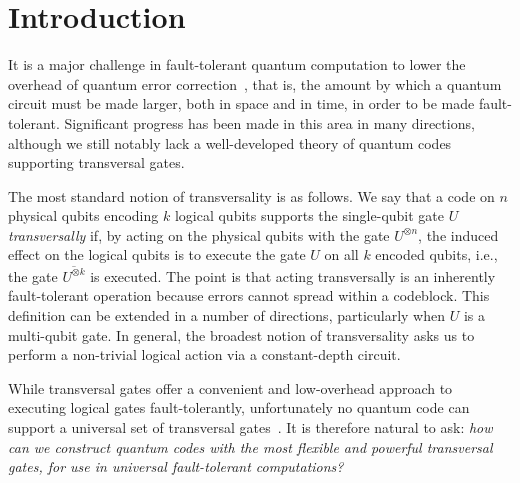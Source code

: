 \documentclass[11pt]{article}
\theoremstyle{definition}
\begin{document}
\enlargethispage{1cm}
\tableofcontents
{}
\newpage
{}

\section{Introduction}

    
    
    
    
    
    
    
    
    
    



    
    It is a major challenge in fault-tolerant quantum computation to lower the overhead of quantum error correction~\cite{shor1995scheme,gottesman1997stabilizer,aharonov1997fault}, that is, the amount by which a quantum circuit must be made larger, both in space and in time, in order to be made fault-tolerant. Significant progress has been made in this area in many directions, although we still notably lack a well-developed theory of quantum codes supporting transversal gates. 
    
    The most standard notion of transversality is as follows. We say that a code on $n$ physical qubits encoding $k$ logical qubits supports the single-qubit gate $U$ \emph{transversally} if, by acting on the physical qubits with the gate $U^{\otimes n}$, the induced effect on the logical qubits is to execute the gate $U$ on all $k$ encoded qubits, i.e., the gate $\overline{U^{\otimes k}}$ is executed. The point is that acting transversally is an inherently fault-tolerant operation because errors cannot spread within a codeblock. This definition can be extended in a number of directions, particularly when $U$ is a multi-qubit gate. 
    In general, the broadest notion of transversality asks us to perform a non-trivial logical action via a constant-depth circuit.

    While transversal gates offer a  convenient and low-overhead approach to executing logical gates fault-tolerantly,
    unfortunately no quantum code can support a universal set of transversal gates~\cite{eastin2009restrictions}. 
    It is therefore natural to ask: \textit{how can we construct quantum codes with the most flexible and powerful transversal gates, for use in universal fault-tolerant computations?}
    
\end{document}
